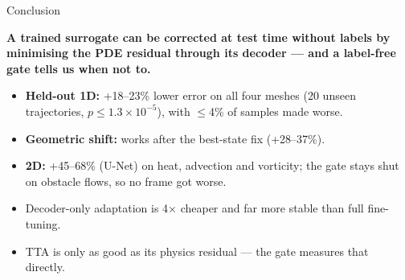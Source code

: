 \documentclass[aspectratio=169,11pt]{beamer}
\begin{document}
\begin{frame}{Conclusion}
\begin{center}
\textbf{A trained surrogate can be corrected at test time without labels by minimising the PDE residual through its decoder --- and a label-free gate tells us when not to.}
\end{center}
\vspace{4pt}
\begin{itemize}\small\setlength{\itemsep}{3pt}
\item \textbf{Held-out 1D:} +18--23\% lower error on all four meshes (20 unseen trajectories, $p\le1.3\times10^{-5}$), with $\le$4\% of samples made worse.
\item \textbf{Geometric shift:} works after the best-state fix (+28--37\%).
\item \textbf{2D:} +45--68\% (U-Net) on heat, advection and vorticity; the gate stays shut on obstacle flows, so no frame got worse.
\item Decoder-only adaptation is 4$\times$ cheaper and far more stable than full fine-tuning.
\item TTA is only as good as its physics residual --- the gate measures that directly.
\end{itemize}
\end{frame}
\end{document}
